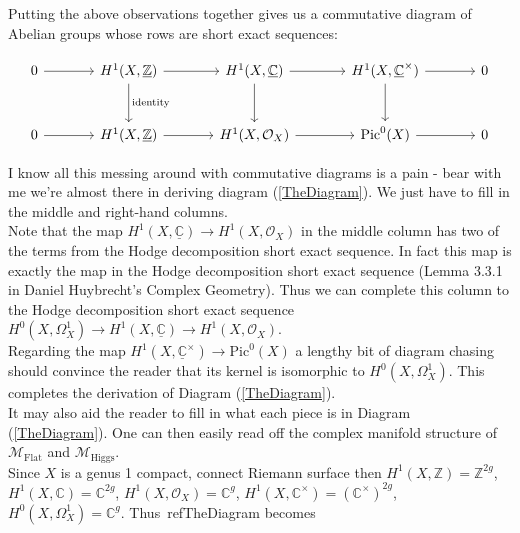 Putting the above observations together gives us a commutative diagram of Abelian groups whose rows are short exact sequences:

\begin{equation}\label{ModifiedMainDiagram}
\begin{tikzcd}[sep=large]
0 \arrow[r] & H^{1}(X,\underline{\mathbb{Z}} \arrow[r] \arrow[d, "\textrm{identity}"]) & H^{1}(X,\underline{\mathbb{C}}) \arrow[r] \arrow[d]  & H^{1}(X,\underline{\mathbb{C}}^\times) \arrow[d] \arrow[r] & 0 \\
0 \arrow[r] & H^{1}(X,\underline{\mathbb{Z}}) \arrow[r] & H^{1}(X,\mathcal{O}_{X}) \arrow[r] & \textrm{Pic}^{0}(X) \arrow[r] & 0
\end{tikzcd}
\end{equation}

I know all this messing around with commutative diagrams is a pain - bear with me we're almost there in deriving diagram (\ref{TheDiagram}). We just have to fill in the middle and right-hand columns.\\

Note that the map $H^{1}(X,\underline{\mathbb{C}})\rightarrow H^{1}(X,\mathcal{O}_{X})$ in the middle column has two of the terms from the Hodge decomposition short exact sequence. In fact this map is exactly the map in the Hodge decomposition short exact sequence (Lemma 3.3.1 in Daniel Huybrecht's Complex Geometry). Thus we can complete this column to the Hodge decomposition short exact sequence $H^{0}(X,\Omega^{1}_{X})\rightarrow H^{1}(X,\underline{\mathbb{C}})\rightarrow H^{1}(X,\mathcal{O}_{X})$.\\

Regarding the map $H^{1}(X,\underline{\mathbb{C}}^\times)\rightarrow\textrm{Pic}^{0}(X)$ a lengthy bit of diagram chasing should convince the reader that its kernel is isomorphic to $H^{0}(X,\Omega^{1}_{X})$. This completes the derivation of Diagram (\ref{TheDiagram}).\\

It may also aid the reader to fill in what each piece is in Diagram (\ref{TheDiagram}). One can then easily read off the complex manifold structure of $\mathcal{M}_{\mathrm{Flat}}$ and $\mathcal{M}_{\mathrm{Higgs}}$.\\

Since $X$ is a genus 1 compact, connect Riemann surface then $H^1(X,\mathbb{Z} ) = \mathbb{Z} ^{2g} $, $ H^1 (X,\mathbb{C} ) = \mathbb{C} ^{2g} $, $H^1 (X,\mathcal{O} _X )  = \mathbb{C}^{g} $, $H^1(X,\mathbb{C} ^\times) = (\mathbb{C} ^\times) ^{2g} $, $H^0 (X,\Omega_X ^1)=\mathbb{C}^{g}$. Thus~ref{TheDiagram} becomes


